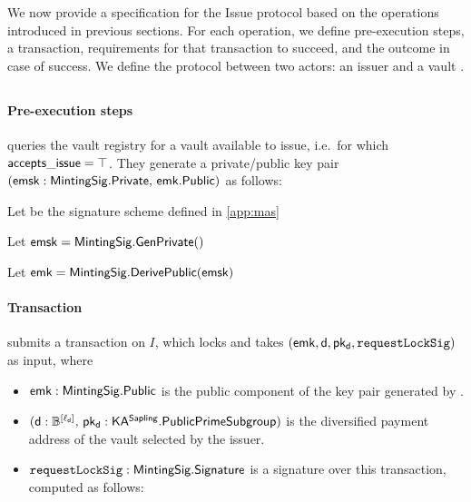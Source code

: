We now provide a specification for the Issue protocol based on the operations introduced in previous sections.
For each operation, we define pre-execution steps, a transaction, requirements for that transaction to succeed, and the outcome in case of success.
We define the protocol between two actors: an issuer \issuer and a vault \vault.

\subsection{\requestLockop}

\paragraph{Pre-execution steps}
\issuer queries the vault registry for a vault available to issue, i.e.\ for which $\mathsf{accepts\_issue} = \top$.
They generate a \mas private/public key pair $(\mathsf{emsk} : \mathsf{MintingSig}.\mathsf{Private},\, \mathsf{emk}.\mathsf{Public})$ as follows:
\begin{alg}
    \item Let \mas be the signature scheme defined in \cref{app:mas}
    \item Let $\mathsf{emsk} = \mathsf{MintingSig}.\mathsf{GenPrivate()}$
    \item Let $\mathsf{emk} = \mathsf{MintingSig}.\mathsf{DerivePublic}(\mathsf{emsk})$
\end{alg}

\paragraph{Transaction}
\issuer submits a \requestLock transaction on $I$, which locks \iw and takes $(\mathsf{emk}, \mathsf{d}, \mathsf{pk_d}, \mathtt{requestLockSig})$ as input, where
\begin{itemize}
    \item $\mathsf{emk} : \mathsf{MintingSig}.\mathsf{Public}$ is the public component of the key pair generated by \issuer.

    \item $(\mathsf{d} : \mathbb{B}^{[\ell_{\mathsf{d}}]},\, \mathsf{pk_d} : \mathsf{KA^{Sapling}}.\mathsf{PublicPrimeSubgroup})$ is the diversified payment address of the vault \vault selected by the issuer.
    
    \item $\mathtt{requestLockSig} : \mathsf{MintingSig}.\mathsf{Signature}$ is a signature over this transaction, computed as follows:
\end{itemize}

